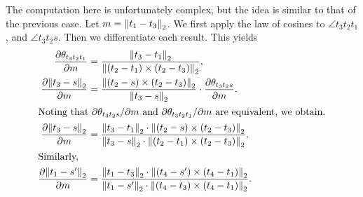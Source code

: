 \begin{itemize}
	The computation here is unfortunately complex, but the idea is similar to that of the previous case. Let \(m = \norm{t_1 - t_3}_2\). We first apply the law of cosines to \(\angle t_3t_2t_1\), and \(\angle t_3t_2s\). Then we differentiate each result. This yields \begin{align*}
		\frac{\partial\theta_{t_3t_2t_1}}{\partial m} &= \frac{\norm{t_3 - t_1}_2}{\norm{\pof{t_2 - t_1} \times \pof{t_2 - t_3}}_2}, \\
		\frac{\partial\norm{t_3 - s}_2}{\partial m} &= \frac{\norm{\pof{t_2 - s} \times \pof{t_2 - t_3}}_2}{\norm{t_3 - s}_2} \cdot \frac{\partial\theta_{t_3t_2s}}{\partial m}. \\
		\intertext{Noting that \(\partial\theta_{t_3t_2s} / \partial m\) and \(\partial\theta_{t_3t_2t_1} / \partial m\) are equivalent, we obtain.}
		\frac{\partial\norm{t_3 - s}_2}{\partial m} &= \frac{\norm{t_3 - t_1}_2 \cdot \norm{\pof{t_2 - s} \times \pof{t_2 - t_3}}_2}{\norm{t_3 - s}_2 \cdot \norm{\pof{t_2 - t_1} \times \pof{t_2 - t_3}}_2}. \\
		\intertext{Similarly,}
		\frac{\partial\norm{t_1 - s'}_2}{\partial m} &= \frac{\norm{t_1 - t_3}_2 \cdot \norm{\pof{t_4 - s'} \times \pof{t_4 - t_1}}_2}{\norm{t_1 - s'}_2 \cdot \norm{\pof{t_4 - t_3} \times \pof{t_4 - t_1}}_2}.
	\end{align*}


\end{itemize}
